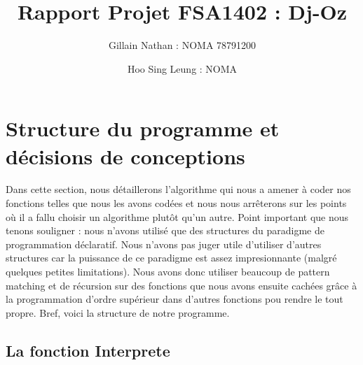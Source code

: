 \documentclass[a4paper,12pt]{article}
\title{Rapport Projet FSA1402 : Dj-Oz}
\author{Gillain Nathan : NOMA 78791200 \and Hoo Sing Leung : NOMA }
\begin{document}
\maketitle
\tableofcontents


\section{Structure du programme et décisions de conceptions}

Dans cette section, nous détaillerons l'algorithme qui nous a amener à coder nos fonctions telles que nous les avons codées et
nous nous arrêterons sur les points où il a fallu choisir un algorithme plutôt qu'un autre. Point important que nous tenons 
souligner : nous n'avons utilisé que des structures du paradigme de programmation déclaratif. Nous n'avons pas juger utile
d'utiliser d'autres structures car la puissance de ce paradigme est assez impresionnante (malgré quelques petites limitations).
Nous avons donc utiliser beaucoup de pattern matching et de récursion sur des fonctions que nous avons ensuite cachées grâce
à la programmation d'ordre supérieur dans d'autres fonctions pou rendre le tout propre. Bref, voici la structure de notre programme.

\subsection{La fonction Interprete}
\end{document}
